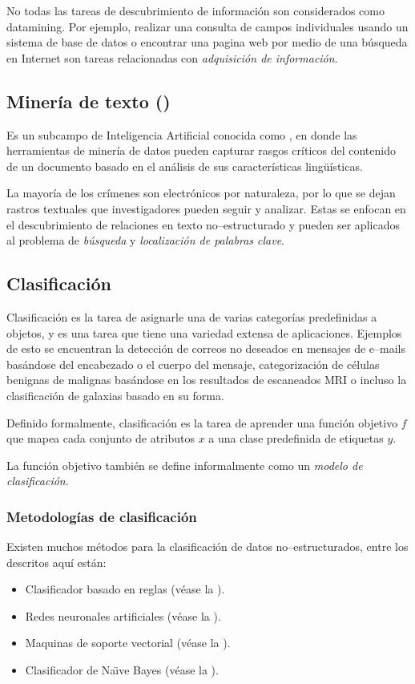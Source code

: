 No todas las tareas de descubrimiento de información son considerados como \gls{datamining}. Por ejemplo, realizar una consulta de campos individuales usando un sistema de base de datos o encontrar una pagina web por medio de una búsqueda en Internet son tareas relacionadas con \emph{adquisición de información}.

\subsection{Minería de texto ()} \label{subsec:NLP}
Es un subcampo de Inteligencia Artificial conocida como , en donde las herramientas de minería de datos pueden capturar rasgos críticos del contenido de un documento basado en el análisis de sus características lingüísticas.

La mayoría de los crímenes son electrónicos por naturaleza, por lo que se dejan rastros textuales que investigadores pueden seguir y analizar. Estas se enfocan en el descubrimiento de relaciones en texto no--estructurado y pueden ser aplicados al problema de \emph{búsqueda} y \emph{localización de palabras clave}.

\subsection{Clasificación} \label{subsec:clasification}
Clasificación es la tarea de asignarle una de varias categorías predefinidas a objetos, y es una tarea que tiene una variedad extensa de aplicaciones. Ejemplos de esto se encuentran la detección de correos no deseados en mensajes de e--mails basándose del encabezado o el cuerpo del mensaje, categorización de células benignas de malignas basándose en los resultados de escaneados MRI o incluso la clasificación de galaxias basado en su forma.

Definido formalmente, clasificación es la tarea de aprender una función objetivo $f$ que mapea cada conjunto de atributos $x$ a una clase predefinida de etiquetas $y$.

La función objetivo también se define informalmente como un \emph{modelo de clasificación}.

\subsubsection{Metodologías de clasificación} \label{subsubsec:classmethods}
Existen muchos métodos para la clasificación de datos no--estructurados, entre los descritos aquí están:
\begin{itemize}
\item Clasificador basado en reglas (véase la ).
\item Redes neuronales artificiales (véase la ).
\item Maquinas de soporte vectorial (véase la ).
\item Clasificador de Na\"{\i}ve Bayes (véase la ).
\end{itemize}

